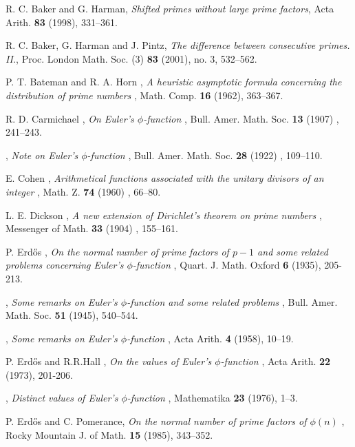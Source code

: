 \documentclass[11pt]{amsart}
\theoremstyle{remark}
\theoremstyle{plain}
\numberwithin{equation}{section}
\renewcommand{\(}{\left(}
\renewcommand{\)}{\right)}
\begin{document}
\begin{thebibliography}{EH38}

 R. C. Baker and G. Harman,
 {\it Shifted primes without large prime
factors},  Acta Arith.  {\bf 83} (1998), 331--361.

 R. C. Baker, G. Harman and J. Pintz,
{\it The difference between consecutive primes. II.},
Proc. London Math. Soc. (3) {\bf 83} (2001), no. 3, 532--562.


 P. T. Bateman and R. A. Horn , {\it  A heuristic
asymptotic formula concerning the distribution of prime numbers }, 
Math. Comp. {\bf  16 } (1962), 363--367. 

 R. D. Carmichael , {\it  On Euler's $\phi$-function
},  Bull. Amer. Math. Soc. {\bf  13 } (1907) , 241--243. 

 \bysame , {\it  Note on Euler's $\phi$-function
},  Bull. Amer. Math. Soc. {\bf  28 } (1922) , 109--110.

 E. Cohen , {\it  Arithmetical functions associated with the
unitary divisors of an integer },  Math. Z. {\bf  74 } (1960) , 66--80.


 L. E. Dickson , {\it  A new extension of Dirichlet's
theorem on prime numbers },  Messenger of Math. {\bf  33 } (1904)
, 155--161.


 P. Erd\H os , {\it  On the normal number of prime
factors of $p-1$ and some related problems concerning Euler's
$\phi$-function },  Quart. J. Math. Oxford {\bf 6} (1935), 205-213.

 \bysame , {\it  Some remarks on Euler's $\phi$-function
and some related problems },  Bull. Amer. Math. Soc. {\bf  51} (1945),
540--544.

 \bysame , {\it  Some remarks on Euler's $\phi$-function
},  Acta Arith. {\bf 4}  (1958), 10--19. 

 P. Erd\H os and R.R.Hall , {\it  On the values of Euler's
$\phi$-function },  Acta Arith. {\bf  22 } (1973), 201-206. 

 \bysame , {\it  Distinct values of Euler's $\phi$-function
},  Mathematika {\bf  23 } (1976), 1--3. 

 P. Erd\H os and C. Pomerance, {\it  On the normal number
of prime factors of $\phi(n)$ },  Rocky Mountain J. of Math. {\bf  15
} (1985), 343--352.


\end{thebibliography}
\end{document}
